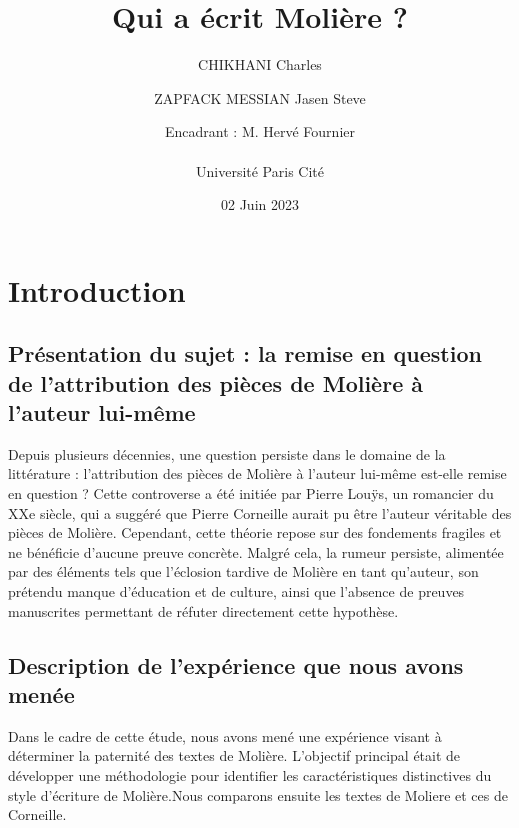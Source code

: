 \documentclass[]{report}
\title{Qui a écrit Molière ?}
\author{CHIKHANI Charles \and ZAPFACK MESSIAN Jasen Steve \\ \and Encadrant : M. Hervé Fournier\\ \\ Université Paris Cité}
\date{02 Juin 2023}
\begin{document}
	\maketitle
	
	\begin{abstract}
	\end{abstract}


	\maketitle
	\tableofcontents
	
	\newpage
\renewcommand{\thesection}{\arabic{section}}
	\section{Introduction}
	\subsection{Présentation du sujet : la remise en question de l'attribution des pièces de Molière à l'auteur lui-même}
\vspace{\baselineskip}
\hspace{0,5cm}Depuis plusieurs décennies, une question persiste dans le domaine
de la littérature : l'attribution des pièces de Molière à l'auteur lui-même
est-elle remise en question ? Cette controverse a été initiée par Pierre Louÿs,
un romancier du XXe siècle, qui a suggéré que Pierre Corneille aurait pu être
l'auteur véritable des pièces de Molière. Cependant, cette théorie repose sur
des fondements fragiles et ne bénéficie d'aucune preuve concrète. Malgré cela,
la rumeur persiste, alimentée par des éléments tels que l'éclosion tardive de
Molière en tant qu'auteur, son prétendu manque d'éducation et de culture, ainsi
que l'absence de preuves manuscrites permettant de réfuter directement cette
hypothèse.


\vspace{\baselineskip}
\subsection{Description de l'expérience que nous avons menée}
\vspace{\baselineskip}
\hspace{0,5cm}Dans le cadre de cette étude, nous avons mené une expérience
visant à déterminer la paternité des textes de Molière. L'objectif principal
était de développer une méthodologie pour identifier les caractéristiques
distinctives du style d'écriture de Molière.Nous comparons ensuite les textes de
Moliere et ces de Corneille.
\end{document}
